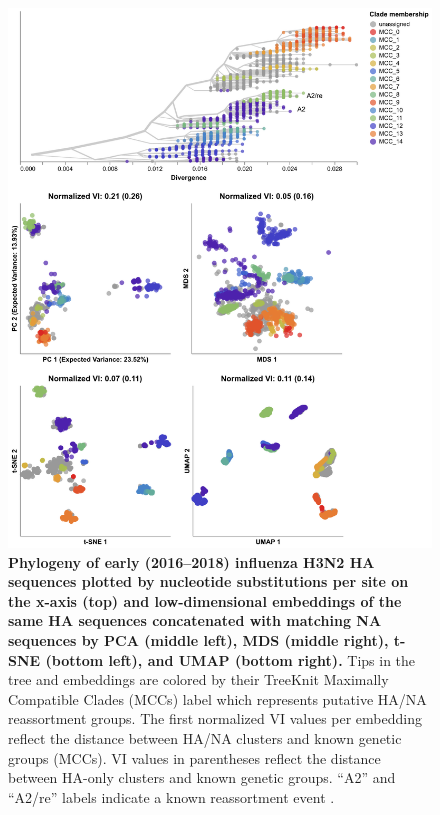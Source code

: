 \documentclass[10pt,letterpaper]{article}
\begin{document}
\begin{figure}[!h]
\includegraphics[width=\columnwidth]{figures/flu-2016-2018-ha-na-embeddings-by-mcc.png}
\caption{{\bf Phylogeny of early (2016--2018) influenza H3N2 HA sequences plotted by nucleotide substitutions per site on the x-axis (top) and low-dimensional embeddings of the same HA sequences concatenated with matching NA sequences by PCA (middle left), MDS (middle right), t-SNE (bottom left), and UMAP (bottom right).}
  Tips in the tree and embeddings are colored by their TreeKnit Maximally Compatible Clades (MCCs) label which represents putative HA/NA reassortment groups.
  The first normalized VI values per embedding reflect the distance between HA/NA clusters and known genetic groups (MCCs).
  VI values in parentheses reflect the distance between HA-only clusters and known genetic groups.
  ``A2'' and ``A2/re'' labels indicate a known reassortment event \cite{Potter2019}.
}
\label{fig:seasonal-influenza-h3n2-ha-na-2016-2018-embeddings}
\end{figure}
\end{document}

